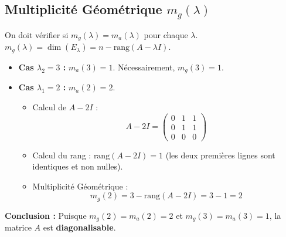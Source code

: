 \documentclass[french]{yLectureNote}
\begin{document}
\subsection{Multiplicité Géométrique $m_g(\lambda)$}

On doit vérifier si $m_g(\lambda) = m_a(\lambda)$ pour chaque $\lambda$. $m_g(\lambda) = \dim(E_\lambda) = n - \text{rang}(A - \lambda I)$.

\begin{itemize}
    \item \textbf{Cas $\lambda_2 = 3$ :} $m_a(3) = 1$. Nécessairement, $m_g(3) = 1$.

    \item \textbf{Cas $\lambda_1 = 2$ :} $m_a(2) = 2$.
    \begin{itemize}
        \item Calcul de $A - 2I$ :
        $$A - 2I = \begin{pmatrix} 0 & 1 & 1 \\ 0 & 1 & 1 \\ 0 & 0 & 0 \end{pmatrix}$$
        \item Calcul du rang : $\text{rang}(A - 2I) = 1$ (les deux premières lignes sont identiques et non nulles).
        \item Multiplicité Géométrique :
        $$m_g(2) = 3 - \text{rang}(A - 2I) = 3 - 1 = 2$$
    \end{itemize}
\end{itemize}

\textbf{Conclusion :} Puisque $m_g(2) = m_a(2) = 2$ et $m_g(3) = m_a(3) = 1$, la matrice $A$ est \textbf{diagonalisable}.
\end{document}
